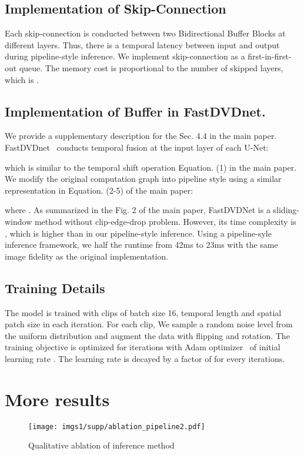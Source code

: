 \documentclass[sigconf]{acmart}
\begin{document}
\subsection{Implementation of Skip-Connection}
 Each skip-connection is conducted between two Bidirectional Buffer Blocks at different layers. Thus, there is a temporal latency between input and output during pipeline-style inference. We implement skip-connection as a first-in-first-out queue. The memory cost is proportional to the number of skipped layers, which is .


\subsection{Implementation of Buffer in FastDVDnet.}
We provide a supplementary description for the Sec. 4.4 in the main paper.
FastDVDnet~\cite{Tassano2020FastDVDNet} conducts temporal fusion at the input layer of each U-Net:

which is similar to the temporal shift operation Equation. (1) in the main paper.
We modify the original computation graph into pipeline style
using a similar representation in Equation. (2-5) of the main paper:

where . As summarized in the Fig. 2 of the main paper, FastDVDNet is a sliding-window method without clip-edge-drop problem. However, its time complexity is , which is higher than  in our pipeline-style inference.
Using a pipeline-syle inference framework, we half the runtime from 42ms to 23ms with the same image fidelity as the original implementation.
\subsection{Training Details}
The model is trained with clips of batch size 16, temporal length  and spatial patch size  in each iteration. For each clip, We sample a random noise level  from the uniform distribution  and augment the data with flipping and rotation. The training objective is optimized for  iterations with Adam optimizer~\cite{Kingma2015Adam} of initial learning rate . The learning rate is decayed by a factor of  for every  iterations.



\section{More results}

\begin{figure}[ht]
\centering
\texttt{[image: imgs1/supp/ablation\_pipeline2.pdf]}
\caption{Qualitative ablation of inference method}
\label{fig:ablation_pipeline2}
\end{figure}
\end{document}
